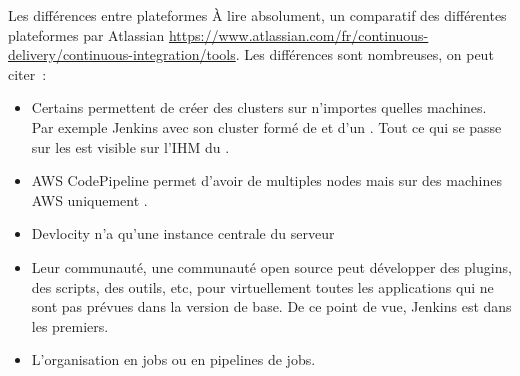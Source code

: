\documentclass{beamer}
\begin{document}
    \begin{frame}{Les différences entre plateformes}
        \transdissolve
        À lire absolument, un comparatif des différentes plateformes par Atlassian \url{https://www.atlassian.com/fr/continuous-delivery/continuous-integration/tools}.
        \bigbreak
        Les différences sont nombreuses, on peut citer~:
        \begin{itemize}
            \item Certains permettent de créer des clusters sur n'importes quelles machines.
            Par exemple Jenkins avec son cluster formé de  et d'un .
            Tout ce qui se passe sur les  est visible sur l'IHM du .
            \item AWS CodePipeline permet d'avoir de multiples nodes mais sur des machines AWS uniquement .
            \item Devlocity n'a qu'une instance centrale du serveur
            \item Leur communauté, une communauté open source peut développer des plugins, des scripts, des outils, etc, pour virtuellement toutes les applications qui ne sont pas prévues dans la version de base.
            De ce point de vue, Jenkins est dans les premiers.
            \item L'organisation en jobs ou en pipelines de jobs.
        \end{itemize}
    \end{frame}
\end{document}
